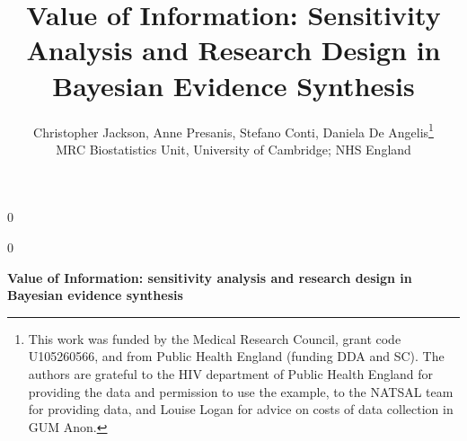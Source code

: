 \documentclass[12pt]{article}\usepackage[]{graphicx}\usepackage[]{color}
\newcommand{\blind}{0}
\begin{document}
%

\def\spacingset#1{\renewcommand{\baselinestretch}%
{#1}\small\normalsize} \spacingset{1}



\blind
{
  \title{\bf Value of Information: Sensitivity Analysis and Research Design in Bayesian Evidence Synthesis}
  \author{Christopher Jackson, Anne Presanis, Stefano Conti, Daniela De Angelis\thanks{
    This work was funded by the Medical Research Council, grant code U105260566, and from Public Health England (funding DDA and SC).  The authors are grateful to the HIV department of Public Health England for providing the data and permission to use the example, to the NATSAL team for providing data, and Louise Logan for advice on costs of data collection in GUM Anon.}\hspace{.2cm}\\
    MRC Biostatistics Unit, University of Cambridge; NHS England\\
  }
  \maketitle
} \fi

\blind
{
  \bigskip
  \bigskip
  \bigskip
  \begin{center}
    {\LARGE\bf Value of Information: sensitivity analysis and research design in Bayesian evidence synthesis}
\end{center}
  \medskip
} \fi

\bigskip
\end{document}
